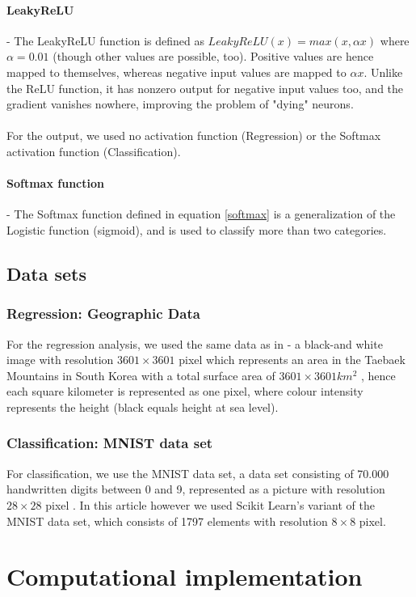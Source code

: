 \documentclass[11pt,a4paper,titlepage]{article}
\begin{document}
\paragraph*{LeakyReLU} - The LeakyReLU function is defined as $LeakyReLU(x)=max(x,\alpha x)$ where $\alpha=0.01$ (though other values are possible, too). Positive values are hence mapped to themselves, whereas negative input values are mapped to $\alpha x$. Unlike the ReLU function, it has nonzero output for negative input values too, and the gradient vanishes nowhere, improving the problem of "dying" neurons.\\\\
For the output, we used no activation function (Regression) or the Softmax activation function (Classification). 
\paragraph*{Softmax function} - The Softmax function defined in equation \eqref{softmax} is a generalization of the Logistic function (sigmoid), and is used to classify more than two categories.
\subsection{Data sets}
\subsubsection{Regression: Geographic Data}
For the regression analysis, we used the same data as in \citep{Project1} - a black-and white image with resolution $3601 \times 3601$ pixel which represents an area in the Taebaek Mountains in South Korea with a total surface area of $3601 \times 3601km^2$ , hence each square kilometer is represented as one pixel, where colour intensity represents the height (black equals height at sea level).
\subsubsection{Classification: MNIST data set}
For classification, we use the MNIST data set, a data set consisting of 70.000 handwritten digits between 0 and 9, represented as a picture with resolution $28\times28$ pixel \citep{lecun2010mnist}. In this article however we used Scikit Learn's variant of the MNIST data set, which consists of 1797 elements with resolution $8\times8$ pixel. 
\section{Computational implementation}
\end{document}
